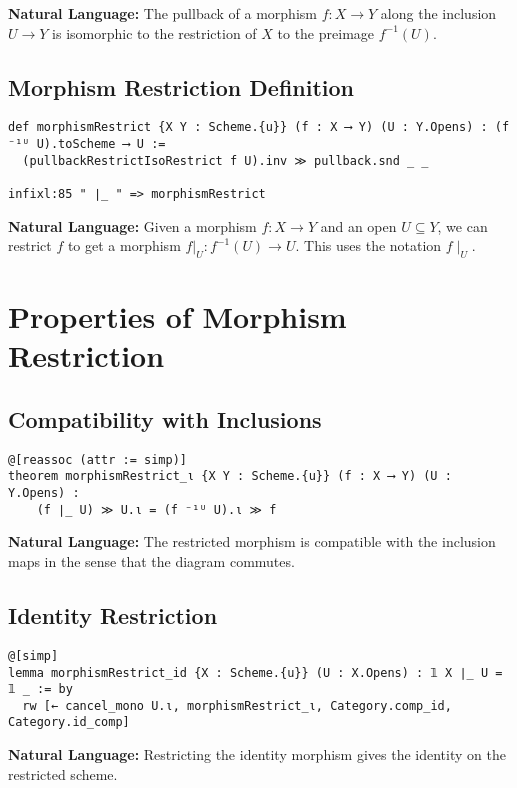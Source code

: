 \documentclass{article}
\theoremstyle{definition}
\begin{document}
\textbf{Natural Language:} The pullback of a morphism $f: X \to Y$ along the inclusion $U \to Y$ is isomorphic to the restriction of $X$ to the preimage $f^{-1}(U)$.

\subsection{Morphism Restriction Definition}

\begin{lstlisting}
def morphismRestrict {X Y : Scheme.{u}} (f : X ⟶ Y) (U : Y.Opens) : (f ⁻¹ᵁ U).toScheme ⟶ U :=
  (pullbackRestrictIsoRestrict f U).inv ≫ pullback.snd _ _

infixl:85 " ∣_ " => morphismRestrict
\end{lstlisting}

\textbf{Natural Language:} Given a morphism $f: X \to Y$ and an open $U \subseteq Y$, we can restrict $f$ to get a morphism $f|_U: f^{-1}(U) \to U$. This uses the notation $f \mid_U$.

\section{Properties of Morphism Restriction}

\subsection{Compatibility with Inclusions}

\begin{lstlisting}
@[reassoc (attr := simp)]
theorem morphismRestrict_ι {X Y : Scheme.{u}} (f : X ⟶ Y) (U : Y.Opens) :
    (f ∣_ U) ≫ U.ι = (f ⁻¹ᵁ U).ι ≫ f
\end{lstlisting}

\textbf{Natural Language:} The restricted morphism is compatible with the inclusion maps in the sense that the diagram commutes.

\subsection{Identity Restriction}

\begin{lstlisting}
@[simp]
lemma morphismRestrict_id {X : Scheme.{u}} (U : X.Opens) : 𝟙 X ∣_ U = 𝟙 _ := by
  rw [← cancel_mono U.ι, morphismRestrict_ι, Category.comp_id, Category.id_comp]
\end{lstlisting}

\textbf{Natural Language:} Restricting the identity morphism gives the identity on the restricted scheme.
\end{document}

